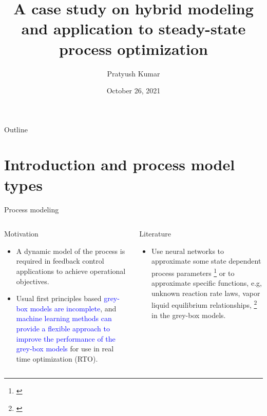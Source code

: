 \documentclass[xcolor=dvipsnames, 8pt]{beamer} %
\title{A case study on hybrid modeling and application to steady-state 
	process optimization}
\date{October 26, 2021}
\author[Pratyush Kumar]{\large Pratyush Kumar}
\institute[UCSB]{
	\begin{minipage}{4in}
		\vspace{-10pt}
		\centering
		\raisebox{-0.1\height}{\texttt{[image: UCSB\_seal]}}
	\end{minipage}
	\vspace{10pt}
	\newline
	{\large Department of chemical engineering}
	\vspace{10pt}
	\newline
	{\large Group Meeting Presentation}}
\begin{document}
\frame{\titlepage}


\begin{frame}{Outline} 
	\tableofcontents 
\end{frame}

\section{Introduction and process model types}
\begin{frame}{Process modeling}

	\begin{columns}
	\column{\textwidth}

	\begin{block}{Motivation}
		\begin{itemize}
		\item A dynamic model of the process is required in feedback
		control applications to achieve operational objectives. \pause
		\item Usual first principles based \textcolor{blue}{grey-box models are
		incomplete}, and \textcolor{blue}{machine learning methods can provide a
		flexible approach to improve the performance of the grey-box
		models} for use in real time optimization (RTO).
		\end{itemize}
	  \end{block}
	  \pause
	  \bigskip
	\begin{block}{Literature}
	  \begin{itemize}
	  \item Use neural networks to approximate some state dependent process
	  parameters \footnote[frame]{\cite{psichogios:ungar:1992}} or to
	  approximate specific functions, e.g, unknown reaction rate laws, vapor
	  liquid equilibrium relationships,
	  \footnote[frame]{\cite{lovelett:avalos:kevrekidis:2019,
	  chen:ierapetritou:2020, bangi:kwon:2020}} in the grey-box models.	
	  \end{itemize}
	\end{block}
  
\end{columns}
\end{frame}
	
\end{document}
